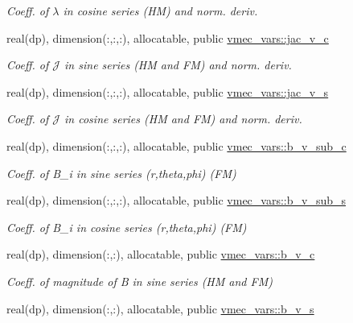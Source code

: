 \begin{DoxyCompactItemize}
\begin{DoxyCompactList}\small\item\em Coeff. of $\lambda$ in cosine series (HM) and norm. deriv. \end{DoxyCompactList}\item 
real(dp), dimension(\+:,\+:,\+:), allocatable, public \hyperlink{namespacevmec__vars_a1cc9293ec589081fb212b88f4e5592f0}{vmec\+\_\+vars\+::jac\+\_\+v\+\_\+c}
\begin{DoxyCompactList}\small\item\em Coeff. of $\mathcal{J}$ in sine series (HM and FM) and norm. deriv. \end{DoxyCompactList}\item 
real(dp), dimension(\+:,\+:,\+:), allocatable, public \hyperlink{namespacevmec__vars_a82168b3717cf13d2d8a50f5cfc19fded}{vmec\+\_\+vars\+::jac\+\_\+v\+\_\+s}
\begin{DoxyCompactList}\small\item\em Coeff. of $\mathcal{J}$ in cosine series (HM and FM) and norm. deriv. \end{DoxyCompactList}\item 
real(dp), dimension(\+:,\+:,\+:), allocatable, public \hyperlink{namespacevmec__vars_a2e07a2b5bd2384e16e8af8ca4f5b50d6}{vmec\+\_\+vars\+::b\+\_\+v\+\_\+sub\+\_\+c}
\begin{DoxyCompactList}\small\item\em Coeff. of B\+\_\+i in sine series (r,theta,phi) (FM) \end{DoxyCompactList}\item 
real(dp), dimension(\+:,\+:,\+:), allocatable, public \hyperlink{namespacevmec__vars_aac5e249f0f14cf1e542f881d1777b730}{vmec\+\_\+vars\+::b\+\_\+v\+\_\+sub\+\_\+s}
\begin{DoxyCompactList}\small\item\em Coeff. of B\+\_\+i in cosine series (r,theta,phi) (FM) \end{DoxyCompactList}\item 
real(dp), dimension(\+:,\+:), allocatable, public \hyperlink{namespacevmec__vars_ad6833cc726863147b8fed188d3a28f5d}{vmec\+\_\+vars\+::b\+\_\+v\+\_\+c}
\begin{DoxyCompactList}\small\item\em Coeff. of magnitude of B in sine series (HM and FM) \end{DoxyCompactList}\item 
real(dp), dimension(\+:,\+:), allocatable, public \hyperlink{namespacevmec__vars_ab2aa43fe35401e8f2b7ffb2facad7109}{vmec\+\_\+vars\+::b\+\_\+v\+\_\+s}

\end{DoxyCompactItemize}
